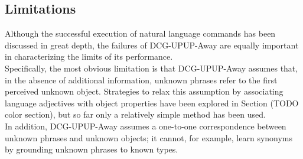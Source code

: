 \subsection{Limitations}
Although the successful execution of natural language commands has been discussed in great depth, the failures of DCG-UPUP-Away are equally important in characterizing the limits of its performance.\\
\indent Specifically, the most obvious limitation is that DCG-UPUP-Away assumes that, in the absence of additional information, unknown phrases refer to the first perceived unknown object.
Strategies to relax this assumption by associating language adjectives with object properties have been explored in Section (TODO color section), but so far only a relatively simple method has been used.\\
\indent In addition, DCG-UPUP-Away assumes a one-to-one correspondence between unknown phrases and unknown objects; it cannot, for example, learn synonyms by grounding unknown phrases to known types.